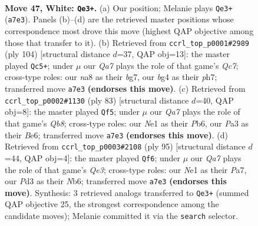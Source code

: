 \documentclass[11pt]{article}
\begin{document}
\clearpage

\begin{figure}[p]\centering
\begin{subfigure}{0.46\textwidth}\centering
\resizebox{\linewidth}{!}{%
\newchessgame
\chessboard[
  setfen={n6r/Q7/4k3/1p6/6bp/P2P4/7K/4Nq2 w - - 8 47},
  showmover=false,
  pgfstyle=straightmove, color=movearrow, markmove={a7-e3}
]}
\caption{}
\end{subfigure}\hfill
\begin{subfigure}{0.46\textwidth}\centering
\resizebox{\linewidth}{!}{%
\newchessgame
\chessboard[
  setfen={5k2/2Q3bp/6p1/8/1P6/q3N1P1/7K/8 w - - 10 53},
  showmover=false,
  pgfstyle=straightmove, color=movearrow, markmove={c7-c5}
]}
\caption{}
\end{subfigure}
\\[4pt]
\begin{subfigure}{0.46\textwidth}\centering
\resizebox{\linewidth}{!}{%
\newchessgame
\chessboard[
  setfen={k7/2Q5/1p2b3/4p2p/P7/8/5PNK/1q6 b - - 0 42},
  showmover=false,
  pgfstyle=straightmove, color=movearrow, markmove={b1-f5}
]}
\caption{}
\end{subfigure}\hfill
\begin{subfigure}{0.46\textwidth}\centering
\resizebox{\linewidth}{!}{%
\newchessgame
\chessboard[
  setfen={1k6/p7/1n2q2P/4p3/4B3/Q1P5/8/1K6 b - - 0 48},
  showmover=false,
  pgfstyle=straightmove, color=movearrow, markmove={e6-f6}
]}
\caption{}
\end{subfigure}
\caption{\textbf{Move 47, White: \texttt{Qe3+}.} (a) Our position; Melanie plays \texttt{Qe3+} (\texttt{a7e3}). Panels (b)--(d) are the retrieved master positions whose correspondence most drove this move (highest QAP objective among those that transfer to it). (b) Retrieved from \texttt{ccrl\_top\_p0001\#2989} (ply 104) [structural distance $d$=37, QAP obj=13]: the master played \texttt{Qc5+}; under $\mu$ our \emph{Qa7} plays the role of that game's \emph{Qc7}; cross-type roles: our \emph{n}a8 as their \emph{b}g7, our \emph{b}g4 as their \emph{p}h7; transferred move \texttt{a7e3} \textbf{(endorses this move)}. (c) Retrieved from \texttt{ccrl\_top\_p0002\#1130} (ply 83) [structural distance $d$=40, QAP obj=8]: the master played \texttt{Qf5}; under $\mu$ our \emph{Qa7} plays the role of that game's \emph{Qb8}; cross-type roles: our \emph{N}e1 as their \emph{P}b6, our \emph{P}a3 as their \emph{B}e6; transferred move \texttt{a7e3} \textbf{(endorses this move)}. (d) Retrieved from \texttt{ccrl\_top\_p0003\#2108} (ply 95) [structural distance $d$=44, QAP obj=4]: the master played \texttt{Qf6}; under $\mu$ our \emph{Qa7} plays the role of that game's \emph{Qe3}; cross-type roles: our \emph{N}e1 as their \emph{P}a7, our \emph{P}d3 as their \emph{N}b6; transferred move \texttt{a7e3} \textbf{(endorses this move)}. Synthesis: 3 retrieved analogs transferred to \texttt{Qe3+} (summed QAP objective 25, the strongest correspondence among the candidate moves); Melanie committed it via the \texttt{search} selector.}
\label{fig:thought-m92}
\end{figure}
\end{document}
